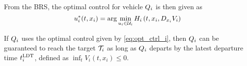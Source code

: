 From the BRS, the optimal control for vehicle $Q_i$ is then given as
\begin{equation}
\label{eq:opt_ctrl_i}
u_i^*(t, x_i) = \arg \min_{u_i \in \mathcal{U}_i} H_i\left(t, x_i, D_{x_i} V_i\right)
\end{equation}

If $Q_i$ uses the optimal control given by \eqref{eq:opt_ctrl_i}, then $Q_i$ can be guaranteed to reach the target $\mathcal{T}_i$ as long as $Q_i$ departs by the latest departure time $t^\text{LDT}_i$, defined as $\inf_t V_i(t, x_i) \le 0$.   